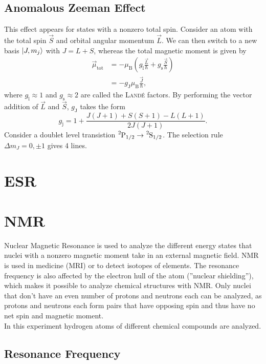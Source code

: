 \subsection{Anomalous Zeeman Effect}
This effect appears for states with a nonzero total spin.
Consider an atom with the total spin $\vec{S}$ and orbital angular momentum $\vec{L}$.
We can then switch to a new basis $\left|J, m_j\right\rangle$ with $J=L+S$, whereas the total magnetic moment is given by
\begin{align*}
	\vec{\mu}_\text{tot} &= -\mu_\text{B}\left(g_\text{l}\frac{\vec{L}}{\hbar} + g_\text{s}\frac{\vec{S}}{\hbar}\right) \\
	&= -g_\text{J}\mu_\text{B}\frac{\vec{J}}{\hbar},
\end{align*}
where $g_\text{l}\approx 1$ and $g_\text{s}\approx 2$ are called the \textsc{Landé} factors.
By performing the vector addition of $\vec{L}$ and $\vec{S}$, $g_\text{J}$ takes the form
\begin{equation*}
	g_\text{j} = 1+\frac{J(J+1)+S(S+1)-L(L+1)}{2J(J+1)}.
\end{equation*}
Consider a doublet level transistion $\ce{^{2}P}_{1/2}\rightarrow \ce{^{2}S}_{1/2}$.
The selection rule $\Delta m_J =0, \pm 1$ gives 4 lines.

\section{ESR}

\section{NMR}
Nuclear Magnetic Resonance is used to analyze the different energy states that nuclei with a nonzero magnetic moment take in an external magnetic field.
NMR is used in medicine (MRI) or to detect isotopes of elements.
The resonance frequency is also affected by the electron hull of the atom (''nuclear shielding''), which makes it possible to analyze chemical structures with NMR.
Only nuclei that don't have an even number of protons and neutrons each can be analyzed, as protons and neutrons each form pairs that have opposing spin and thus have no net spin and magnetic moment.\\
In this experiment hydrogen atoms of different chemical compounds are analyzed.

\subsection{Resonance Frequency}

